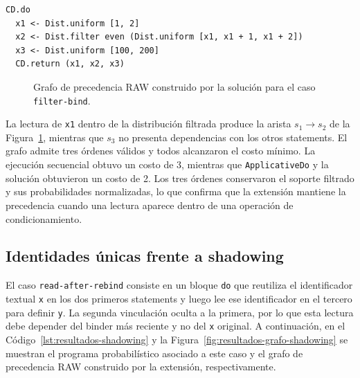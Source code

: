 \begin{lstlisting}[style=haskell,caption={Programa probabilístico asociado al caso \texttt{filter-bind}.},label={lst:resultados-filter-bind}]
CD.do
  x1 <- Dist.uniform [1, 2]
  x2 <- Dist.filter even (Dist.uniform [x1, x1 + 1, x1 + 2])
  x3 <- Dist.uniform [100, 200]
  CD.return (x1, x2, x3)
\end{lstlisting}

\begin{figure}[ht]
\centering
\begin{PrecedenceGraph}[node distance=0.5cm and 0.6cm]
\end{PrecedenceGraph}
\caption[Grafo RAW del caso \texttt{filter-bind}.]{Grafo de precedencia RAW construido por la solución para el caso \texttt{filter-bind}.}
\label{fig:resultados-grafo-filter-bind}
\end{figure}

La lectura de \texttt{x1} dentro de la distribución filtrada produce la arista $s_1\to s_2$ de la Figura~\ref{fig:resultados-grafo-filter-bind}, mientras que $s_3$ no presenta dependencias con los otros statements. El grafo admite tres órdenes válidos y todos alcanzaron el costo mínimo. La ejecución secuencial obtuvo un costo de 3, mientras que \texttt{ApplicativeDo} y la solución obtuvieron un costo de 2. Los tres órdenes conservaron el soporte filtrado y sus probabilidades normalizadas, lo que confirma que la extensión mantiene la precedencia cuando una lectura aparece dentro de una operación de condicionamiento.

\subsection{Identidades únicas frente a shadowing}

El caso \texttt{read-after-rebind} consiste en un bloque \texttt{do} que reutiliza el identificador textual \texttt{x} en los dos primeros statements y luego lee ese identificador en el tercero para definir \texttt{y}. La segunda vinculación oculta a la primera, por lo que esta lectura debe depender del binder más reciente y no del \texttt{x} original. A continuación, en el Código~\ref{lst:resultados-shadowing} y la Figura~\ref{fig:resultados-grafo-shadowing} se muestran el programa probabilístico asociado a este caso y el grafo de precedencia RAW construido por la extensión, respectivamente.

